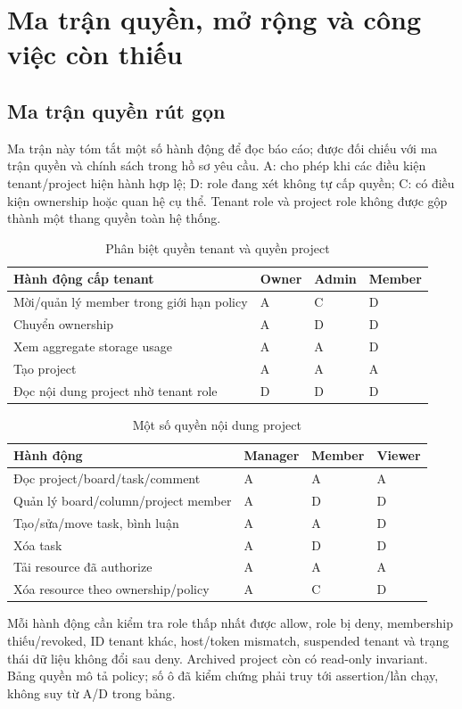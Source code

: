 \chapter{Ma trận quyền, mở rộng và công việc còn thiếu}\label{app:supplementary}
\section{Ma trận quyền rút gọn}\label{app:permissions}
Ma trận này tóm tắt một số hành động để đọc báo cáo; được đối chiếu với ma trận quyền và chính sách trong hồ sơ yêu cầu. A: cho phép khi các điều kiện tenant\slash project hiện hành hợp lệ; D: role đang xét không tự cấp quyền; C: có điều kiện ownership hoặc quan hệ cụ thể. Tenant role và project role không được gộp thành một thang quyền toàn hệ thống.

\begin{table}[htbp]
\centering\caption{Phân biệt quyền tenant và quyền project}\label{tab:roles}
\begin{tabularx}{\textwidth}{XP{.15\textwidth}P{.15\textwidth}P{.15\textwidth}}
\toprule Hành động cấp tenant & Owner & Admin & Member \\
\midrule
Mời\slash quản lý member trong giới hạn policy & A & C & D \\
Chuyển ownership & A & D & D \\
Xem aggregate storage usage & A & A & D \\
Tạo project & A & A & A \\
Đọc nội dung project nhờ tenant role & D & D & D \\
\bottomrule\end{tabularx}
\end{table}

\begin{table}[htbp]
\centering\caption{Một số quyền nội dung project}\label{tab:project-roles}
\begin{tabularx}{\textwidth}{XP{.15\textwidth}P{.15\textwidth}P{.15\textwidth}}
\toprule Hành động & Manager & Member & Viewer \\
\midrule
Đọc project\slash board\slash task\slash comment & A & A & A \\
Quản lý board\slash column\slash project member & A & D & D \\
Tạo\slash sửa\slash move task, bình luận & A & A & D \\
Xóa task & A & D & D \\
Tải resource đã authorize & A & A & A \\
Xóa resource theo ownership\slash policy & A & C & D \\
\bottomrule\end{tabularx}
\end{table}
Mỗi hành động cần kiểm tra role thấp nhất được allow, role bị deny, membership thiếu\slash revoked, ID tenant khác, host\slash token mismatch, suspended tenant và trạng thái dữ liệu không đổi sau deny. Archived project còn có read-only invariant. Bảng quyền mô tả policy; số ô đã kiểm chứng phải truy tới assertion\slash lần chạy, không suy từ A\slash D trong bảng.

